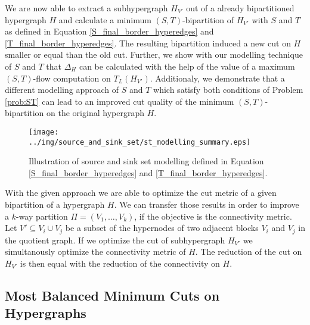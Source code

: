 We are now able to extract a subhypergraph $H_{V'}$ out of a already bipartitioned hypergraph $H$ and
calculate a minimum $(S,T)$-bipartition of $H_{V'}$ with $S$ and $T$ as defined
in Equation \ref{S_final_border_hyperedges} and \ref{T_final_border_hyperedges}. The resulting
bipartition induced a new cut on $H$ smaller or equal than the old cut. Further, we show with our
modelling technique of $S$ and $T$ that $\Delta_H$ can be calculated with the help of the value 
of a maximum $(S,T)$-flow computation on $T_L(H_{V'})$. Additionaly, we demonstrate that a different
modelling approach of $S$ and $T$ which satisfy both conditions of Problem \ref{prob:ST} can lead to
an improved cut quality of the minimum $(S,T)$-bipartition on the original hypergraph $H$.

\begin{figure}
\centering
\texttt{[image: ../img/source\_and\_sink\_set/st\_modelling\_summary.eps]}
\caption{Illustration of source and sink set modelling defined in Equation \ref{S_final_border_hyperedges}
         and \ref{T_final_border_hyperedges}. }
\label{img:st_modelling_summary}
\end{figure}

With the given approach we are able to optimize the cut metric of a given
bipartition of a hypergraph $H$. We can transfer those results in order to improve
a $k$-way partition $\Pi = (V_1,\ldots,V_k)$, if the objective is the connectivity
metric. Let $V' \subseteq V_i \cup V_j$ be a subset of the hypernodes of two adjacent
blocks $V_i$ and $V_j$ in the quotient graph. If we optimize the cut of
subhypergraph $H_{V'}$ we simultanously optimize the connectivity metric of $H$.
The reduction of the cut on $H_{V'}$ is then equal with the reduction of
the connectivity on $H$.

\subsection{Most Balanced Minimum Cuts on Hypergraphs}
\label{sec:mbmc_hypergraphs}

